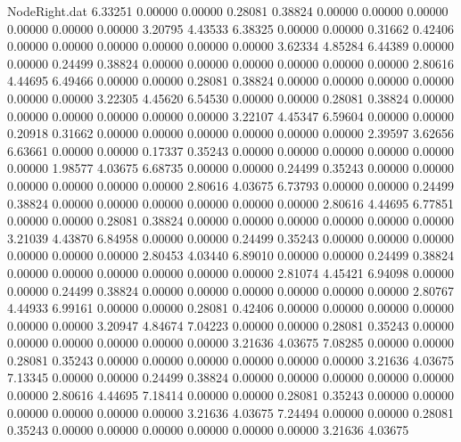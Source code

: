 \begin{filecontents}{NodeRight.dat}
   6.33251    0.00000    0.00000     0.28081    0.38824    0.00000    0.00000    0.00000    0.00000    0.00000    0.00000    3.20795    4.43533
   6.38325    0.00000    0.00000     0.31662    0.42406    0.00000    0.00000    0.00000    0.00000    0.00000    0.00000    3.62334    4.85284
   6.44389    0.00000    0.00000     0.24499    0.38824    0.00000    0.00000    0.00000    0.00000    0.00000    0.00000    2.80616    4.44695
   6.49466    0.00000    0.00000     0.28081    0.38824    0.00000    0.00000    0.00000    0.00000    0.00000    0.00000    3.22305    4.45620
   6.54530    0.00000    0.00000     0.28081    0.38824    0.00000    0.00000    0.00000    0.00000    0.00000    0.00000    3.22107    4.45347
   6.59604    0.00000    0.00000     0.20918    0.31662    0.00000    0.00000    0.00000    0.00000    0.00000    0.00000    2.39597    3.62656
   6.63661    0.00000    0.00000     0.17337    0.35243    0.00000    0.00000    0.00000    0.00000    0.00000    0.00000    1.98577    4.03675
   6.68735    0.00000    0.00000     0.24499    0.35243    0.00000    0.00000    0.00000    0.00000    0.00000    0.00000    2.80616    4.03675
   6.73793    0.00000    0.00000     0.24499    0.38824    0.00000    0.00000    0.00000    0.00000    0.00000    0.00000    2.80616    4.44695
   6.77851    0.00000    0.00000     0.28081    0.38824    0.00000    0.00000    0.00000    0.00000    0.00000    0.00000    3.21039    4.43870
   6.84958    0.00000    0.00000     0.24499    0.35243    0.00000    0.00000    0.00000    0.00000    0.00000    0.00000    2.80453    4.03440
   6.89010    0.00000    0.00000     0.24499    0.38824    0.00000    0.00000    0.00000    0.00000    0.00000    0.00000    2.81074    4.45421
   6.94098    0.00000    0.00000     0.24499    0.38824    0.00000    0.00000    0.00000    0.00000    0.00000    0.00000    2.80767    4.44933
   6.99161    0.00000    0.00000     0.28081    0.42406    0.00000    0.00000    0.00000    0.00000    0.00000    0.00000    3.20947    4.84674
   7.04223    0.00000    0.00000     0.28081    0.35243    0.00000    0.00000    0.00000    0.00000    0.00000    0.00000    3.21636    4.03675
   7.08285    0.00000    0.00000     0.28081    0.35243    0.00000    0.00000    0.00000    0.00000    0.00000    0.00000    3.21636    4.03675
   7.13345    0.00000    0.00000     0.24499    0.38824    0.00000    0.00000    0.00000    0.00000    0.00000    0.00000    2.80616    4.44695
   7.18414    0.00000    0.00000     0.28081    0.35243    0.00000    0.00000    0.00000    0.00000    0.00000    0.00000    3.21636    4.03675
   7.24494    0.00000    0.00000     0.28081    0.35243    0.00000    0.00000    0.00000    0.00000    0.00000    0.00000    3.21636    4.03675

\end{filecontents}
